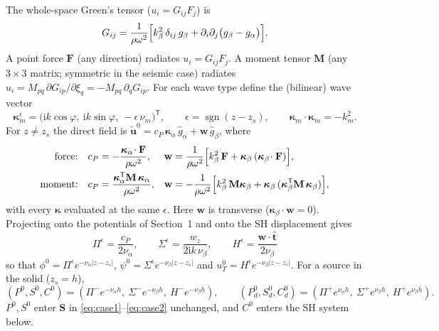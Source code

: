 \documentclass[11pt,a4paper]{article}
\newcommand{\ii}{\mathrm{i}}
\newcommand{\sgn}{\operatorname{sgn}}
\begin{document}
The whole-space Green's tensor ($u_i=G_{ij}F_j$) is
\begin{equation}
  G_{ij}=\frac{1}{\rho\omega^2}\Bigl[k_\beta^2\,\delta_{ij}\,g_\beta+\partial_i\partial_j\bigl(g_\beta-g_\alpha\bigr)\Bigr].
\end{equation}
A point force $\mathbf F$ (any direction) radiates $u_i=G_{ij}F_j$. A moment tensor $\mathbf M$ (any
$3\times3$ matrix; symmetric in the seismic case) radiates
$u_i=M_{pq}\,\partial G_{ip}/\partial\xi_q=-M_{pq}\,\partial_qG_{ip}$. For each wave type define the
(bilinear) wave vector
\begin{equation}
  \bm\kappa_m^{\epsilon}=\bigl(\ii k\cos\varphi,\ \ii k\sin\varphi,\ -\epsilon\,\nu_m\bigr)^{\mathsf T},
  \qquad \epsilon=\sgn(z-z_s),\qquad
  \bm\kappa_m\!\cdot\bm\kappa_m=-k_m^2 .
\end{equation}
For $z\neq z_s$ the direct field is $\tilde{\mathbf u}^0=c_P\,\bm\kappa_\alpha\,\hat g_\alpha+\mathbf w\,\hat g_\beta$, where
\begin{align}
  \text{force:}\quad
  c_P&=-\frac{\bm\kappa_\alpha\!\cdot\mathbf F}{\rho\omega^2}, &
  \mathbf w&=\frac{1}{\rho\omega^2}\Bigl[k_\beta^2\,\mathbf F+\bm\kappa_\beta\,(\bm\kappa_\beta\!\cdot\mathbf F)\Bigr],
  \label{eq:srcF}\\
  \text{moment:}\quad
  c_P&=\frac{\bm\kappa_\alpha^{\mathsf T}\mathbf M\,\bm\kappa_\alpha}{\rho\omega^2}, &
  \mathbf w&=-\frac{1}{\rho\omega^2}\Bigl[k_\beta^2\,\mathbf M\bm\kappa_\beta+\bm\kappa_\beta\,(\bm\kappa_\beta^{\mathsf T}\mathbf M\,\bm\kappa_\beta)\Bigr],
  \label{eq:srcM}
\end{align}
with every $\bm\kappa$ evaluated at the same $\epsilon$. Here $\mathbf w$ is transverse
($\bm\kappa_\beta\!\cdot\mathbf w=0$). Projecting onto the potentials of Section~1 and onto the SH
displacement gives
\begin{equation}
  \boxed{\ \Pi^{\epsilon}=\frac{c_P}{2\nu_\alpha},\qquad
  \Sigma^{\epsilon}=\frac{w_z}{2\ii k\,\nu_\beta},\qquad
  H^{\epsilon}=\frac{\mathbf w\cdot\hat{\mathbf t}}{2\nu_\beta}\ }
  \label{eq:PSH}
\end{equation}
so that $\phi^0=\Pi^\epsilon e^{-\nu_\alpha|z-z_s|}$, $\psi^0=\Sigma^\epsilon e^{-\nu_\beta|z-z_s|}$ and
$u_T^0=H^\epsilon e^{-\nu_\beta|z-z_s|}$. For a source in the solid ($z_s=h$),
\begin{equation}
  (P^0,S^0,C^0)=(\Pi^{-}e^{-\nu_\alpha h},\ \Sigma^{-}e^{-\nu_\beta h},\ H^{-}e^{-\nu_\beta h}),\qquad
  (P^0_d,S^0_d,C^0_d)=(\Pi^{+}e^{\nu_\alpha h},\ \Sigma^{+}e^{\nu_\beta h},\ H^{+}e^{\nu_\beta h}).
\end{equation}
$P^0,S^0$ enter $\mathbf S$ in \eqref{eq:case1}--\eqref{eq:case2} unchanged, and $C^0$ enters the SH
system below.
\end{document}
